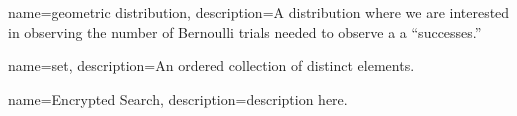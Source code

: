 {
    name={geometric distribution},
    description={A distribution where we are interested in observing the number of Bernoulli trials needed to observe a a ``successes.''}
}

{
    name={set},
    description={An ordered collection of distinct elements.}
}

{
    name={Encrypted Search},
    description={description here.}
}


